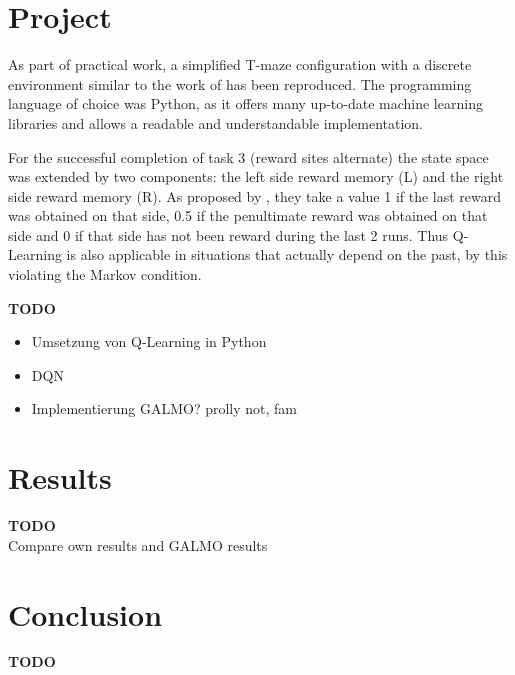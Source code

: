 \documentclass[a4paper]{article}
\begin{document}
	
	\section{Project}
	\label{sec:project}
	As part of practical work, a simplified T-maze configuration with a discrete environment similar to the work of \cite{NeuralDynaQ} has been reproduced. The programming language of choice was Python, as it offers many up-to-date machine learning libraries and allows a readable and understandable implementation.
	\par For the successful completion of task 3 (reward sites alternate) the state space was extended by two components: the left side reward memory (L) and the right side reward memory (R). 
	As proposed by \citet{NeuralDynaQ}, they take a value 1 if the last reward was obtained on that side, 0.5 if the penultimate reward was obtained on that side and 0 if that side has not been reward during the last 2 runs. Thus Q-Learning is also applicable in situations that actually depend on the past, by this violating the Markov condition.\\
	\par \textbf{TODO}
	\begin{itemize}
		\item Umsetzung von Q-Learning in Python
		\item DQN
		\item Implementierung GALMO? prolly not, fam
	\end{itemize}
	
	
	\section{Results}
	\label{sec:results}
	\textbf{TODO}\\
	Compare own results and GALMO results
		
	
	
	\section{Conclusion}
	\label{sec:conclusion}
	\textbf{TODO}
	
	
	\footnotesize
	
	
	
\end{document}
